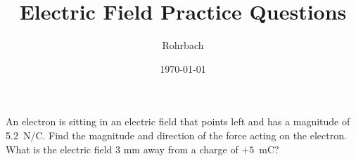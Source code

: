 \documentclass[10pt]{exam}
\title{Electric Field Practice Questions}
\author{Rohrbach}
\date{\today}
\begin{document}
\maketitle

\begin{questions}
\question
  An electron is sitting in an electric field that points left and has a magnitude of 5.2~N/C. Find the magnitude and direction of the force acting on the electron.\vs
\question
  What is the electric field 3 mm away from a charge of $+5$~mC?\vs
\end{questions}
\end{document}
